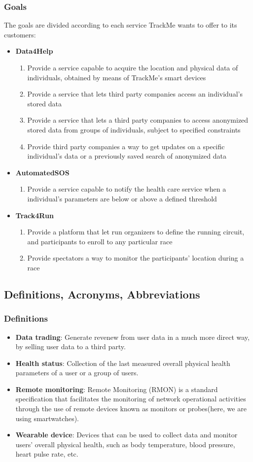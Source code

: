 \documentclass[12pt]{article}
\newcommand\goal[1]{\item[{[G#1]}] }
\begin{document}
\subsubsection{Goals}
The goals are divided according to each service TrackMe wants to offer to its customers:
\begin{itemize}
\item{\textbf{Data4Help}}
\begin{enumerate}
\goal{1} Provide a service capable to acquire the location and physical data of individuals, obtained by means of TrackMe's smart devices
\goal{2} Provide a service that lets third party companies access an individual's stored data 
\goal{3} Provide a service that lets a third party companies to access anonymized stored data from groups of individuals, subject to specified constraints
\goal{4} Provide third party companies a way to get updates on a specific individual's data or a previously saved search of anonymized data
\end{enumerate}
\item{\textbf{AutomatedSOS}}
\begin{enumerate}
\goal{5} Provide a service capable to notify the health care service when a individual's parameters are below or above a defined threshold
\end{enumerate}
\item{\textbf{Track4Run}}
\begin{enumerate}
\goal{6} Provide a platform that let run organizers to define the running circuit, and participants to enroll to any particular race
\goal{7} Provide spectators a way to monitor the participants' location during a race
\end{enumerate}
\end{itemize}

\subsection{Definitions, Acronyms, Abbreviations}
\subsubsection{Definitions}
\begin{itemize}
\item{\textbf{Data trading}}: Generate revenew from user data in a much more direct way, by selling user data to a third party.
\item{\textbf{Health status}}: Collection of the last measured overall physical health parameters of a user or a group of users.
\item{\textbf{Remote monitoring}}: Remote Monitoring (RMON) is a standard specification that facilitates the monitoring of network operational activities through the use of remote devices known as monitors or probes(here, we are using smartwatches).
\item{\textbf{Wearable device}}: Devices that can be used to collect data and monitor users' overall physical health, such as body temperature, blood pressure, heart pulse rate, etc.

\end{itemize}
\end{document}
